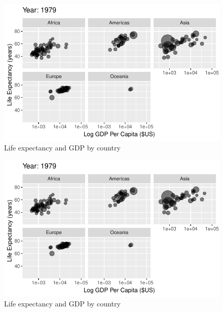 \documentclass[
  letterpaper,
  DIV=11,
  numbers=noendperiod]{scrreport}
\theoremstyle{definition}
\theoremstyle{remark}
\begin{document}
\begin{figure}

{\centering \includegraphics{index_files/figure-pdf/fig-anim-lifegdp-49.pdf}

}

\caption{\label{fig-anim-lifegdp-49}Life expectancy and GDP by country}

\end{figure}

\begin{figure}

{\centering \includegraphics{index_files/figure-pdf/fig-anim-lifegdp-50.pdf}

}

\caption{\label{fig-anim-lifegdp-50}Life expectancy and GDP by country}

\end{figure}
\end{document}
